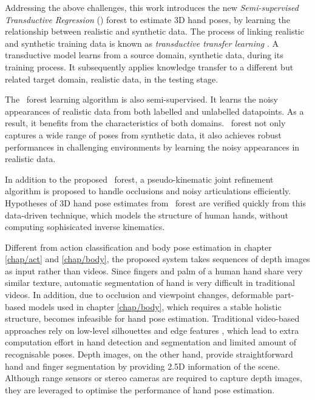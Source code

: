 Addressing the above challenges, this work introduces the new \emph{Semi-supervised Transductive Regression} (\STR) forest to estimate 3D hand poses, by learning the relationship between realistic and synthetic data. 
The process of linking realistic and synthetic training data is known as \emph{transductive transfer learning} \cite{Pan2010}.  
A transductive model learns from a source domain, \eg synthetic data, during its training process.
It subsequently applies knowledge transfer to a different but related target domain, \eg realistic data, in the testing stage. 

The \STR\ forest learning algorithm is also semi-supervised. 
It learns the noisy appearances of realistic data from both labelled and unlabelled datapoints. 
As a result, it benefits from the characteristics of both domains. 
\STR\ forest not only captures a wide range of poses from synthetic data, it also achieves robust performances in challenging environments by learning the noisy appearances in realistic data. 

In addition to the proposed \STR\ forest, a pseudo-kinematic joint refinement algorithm is proposed to handle occlusions and noisy articulations efficiently. 
Hypotheses of 3D hand pose estimates from \STR\ forest are verified quickly from this data-driven technique, which models the structure of human hands, without computing sophisicated inverse kinematics. 

Different from action classification and body pose estimation in chapter \ref{chap/act} and \ref{chap/body}, the proposed system takes sequences of depth images as input rather than videos. 
Since fingers and palm of a human hand share very similar texture, automatic segmentation of hand is very difficult in traditional videos. 
In addition, due to occlusion and viewpoint changes, deformable part-based models used in chapter \ref{chap/body}, which requires a stable holistic structure, becomes infeasible for hand pose estimation.   
Traditional video-based approaches rely on low-level silhouettes and edge features \cite{Rosales2001, Chua2002, Athitsos2003, Stenger2006}, which lead to extra computation effort in hand detection and segmentation and limited amount of recognisable poses.   
Depth images, on the other hand, provide straightforward hand and finger segmentation by providing 2.5D information of the scene. 
Although range sensors or stereo cameras are required to capture depth images, they are leveraged to optimise the performance of hand pose estimation. 

